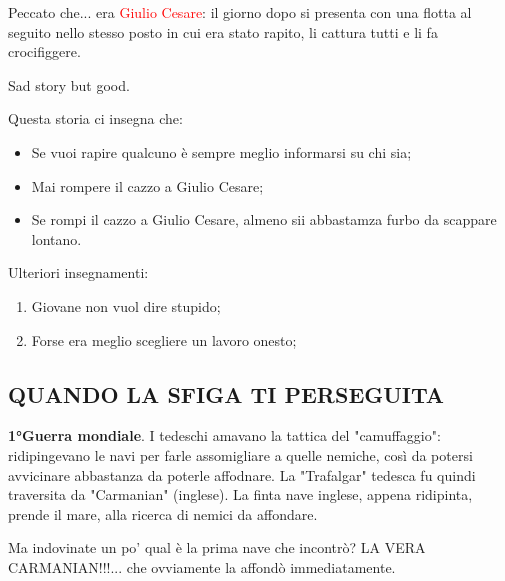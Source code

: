 \documentclass[a4paper, 12pt]{article} %
\begin{document}
\noindent Peccato che... era \textcolor{red}{Giulio Cesare}: il giorno dopo si presenta con una flotta al seguito nello stesso posto in cui era stato rapito, li cattura tutti e li fa crocifiggere.

\noindent Sad story but good. 


\noindent Questa storia ci insegna che:
\begin{itemize} %
    \item Se vuoi rapire qualcuno è sempre meglio informarsi su chi sia; %
    \item Mai rompere il cazzo a Giulio Cesare;
    \item Se rompi il cazzo a Giulio Cesare, almeno sii abbastamza furbo da scappare lontano.
\end{itemize} %

\noindent Ulteriori insegnamenti:
\begin{enumerate} %
    \item Giovane non vuol dire stupido; %
    \item Forse era meglio scegliere un lavoro onesto;
\end{enumerate} %

\subsection{QUANDO LA SFIGA TI PERSEGUITA}
\textbf{1°Guerra mondiale}. I tedeschi amavano la tattica del "camuffaggio": ridipingevano le navi per farle assomigliare a quelle nemiche, così da potersi avvicinare abbastanza da poterle affodnare. 
\noindent La "Trafalgar" tedesca fu quindi traversita da "Carmanian" (inglese). La finta nave inglese, appena ridipinta, prende il mare, alla ricerca di nemici da affondare. 

\noindent Ma indovinate un po' qual è la prima nave che incontrò? LA VERA CARMANIAN!!!... che ovviamente la affondò immediatamente.
\end{document}
